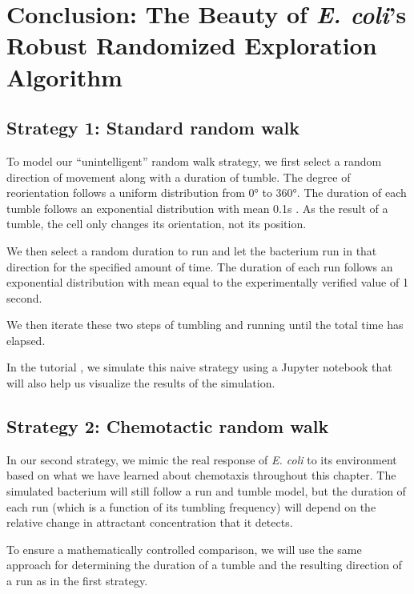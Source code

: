 \FloatBarrier
{}

\section{Conclusion: The Beauty of \textit{E. coli}'s Robust Randomized Exploration Algorithm}
\label{sec:conclusion}

\subsection{Strategy 1: Standard random walk}

To model our ``unintelligent'' random walk strategy, we first select a random direction of movement along with a duration of tumble. The degree of reorientation follows a uniform distribution from 0° to 360°. The duration of each tumble follows an exponential distribution with mean 0.1s \citep{Saragosti_2012}. As the result of a tumble, the cell only changes its orientation, not its position.

We then select a random duration to run and let the bacterium run in that direction for the specified amount of time. The duration of each run follows an exponential distribution with mean equal to the experimentally verified value of 1 second.

We then iterate these two steps of tumbling and running until the total time has elapsed.

In the tutorial , we simulate this naive strategy using a Jupyter notebook that will also help us visualize the results of the simulation.

\FloatBarrier
{}
{}
\subsection{Strategy 2: Chemotactic random walk}


In our second strategy, we mimic the real response of \textit{E. coli} to its environment based on what we have learned about chemotaxis throughout this chapter. The simulated bacterium will still follow a run and tumble model, but the duration of each run (which is a function of its tumbling frequency) will depend on the relative change in attractant concentration that it detects.

To ensure a mathematically controlled comparison, we will use the same approach for determining the duration of a tumble and the resulting direction of a run as in the first strategy.

